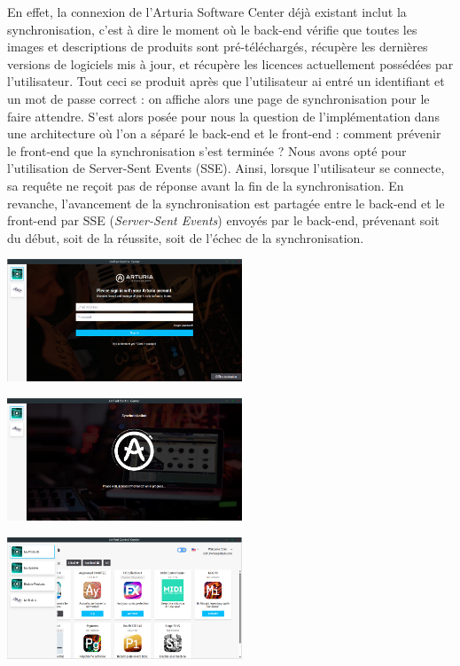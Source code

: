 \documentclass[francais]{rapportPFE}  %
\begin{document}
En effet, la connexion de l'Arturia Software Center déjà existant inclut la synchronisation, c'est à dire le moment où le back-end vérifie que toutes les images et descriptions de produits sont pré-téléchargés, récupère les dernières versions de logiciels mis à jour, et récupère les licences actuellement possédées par l'utilisateur. Tout ceci se produit après que l'utilisateur ai entré un identifiant et un mot de passe correct : on affiche alors une page de synchronisation pour le faire attendre. S'est alors posée pour nous la question de l'implémentation dans une architecture où l'on a séparé le back-end et le front-end : comment prévenir le front-end que la synchronisation s'est terminée ? Nous avons opté pour l'utilisation de Server-Sent Events (SSE). Ainsi, lorsque l'utilisateur se connecte, sa requête ne reçoit pas de réponse avant la fin de la synchronisation. En revanche, l'avancement de la synchronisation est partagée entre le back-end et le front-end par SSE (\textit{Server-Sent Events}) envoyés par le back-end, prévenant soit du début, soit de la réussite, soit de l'échec de la synchronisation.
\begin{center}
    \centering
    \begin{minipage}{.5\textwidth}
    \centering
    \includegraphics[width=7cm]{graphics/disconnected.png}
    \label{fig:test1}
    \end{minipage}%
    \begin{minipage}{.5\textwidth}
    \centering
    \includegraphics[width=7cm]{graphics/sync.png}
    \label{fig:test2}
    \end{minipage}
    \begin{minipage}{.5\textwidth}
    \centering
    \includegraphics[width=7cm]{graphics/connected.png}
    \label{fig:test2}
    \end{minipage}
\end{center}
\end{document}
